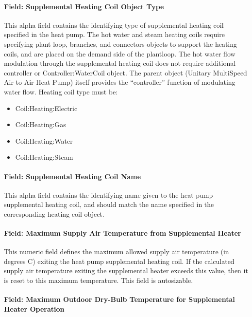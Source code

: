 \paragraph{Field: Supplemental Heating Coil Object Type}\label{field-supplemental-heating-coil-object-type-2}

This alpha field contains the identifying type of supplemental heating coil specified in the heat pump. The hot water and steam heating coils require specifying plant loop, branches, and connectors objects to support the heating coils, and are placed on the demand side of the plantloop. The hot water flow modulation through the supplemental heating coil does not require additional controller or Controller:WaterCoil object. The parent object (Unitary MultiSpeed Air to Air Heat Pump) itself provides the ``controller'' function of modulating water flow. Heating coil type must be:

\begin{itemize}
\item
  Coil:Heating:Electric
\item
  Coil:Heating:Gas
\item
  Coil:Heating:Water
\item
  Coil:Heating:Steam
\end{itemize}

\paragraph{Field: Supplemental Heating Coil Name}\label{field-supplemental-heating-coil-name-2}

This alpha field contains the identifying name given to the heat pump supplemental heating coil, and should match the name specified in the corresponding heating coil object.

\paragraph{Field: Maximum Supply Air Temperature from Supplemental Heater}\label{field-maximum-supply-air-temperature-from-supplemental-heater-1}

This numeric field defines the maximum allowed supply air temperature (in degrees C) exiting the heat pump supplemental heating coil. If the calculated supply air temperature exiting the supplemental heater exceeds this value, then it is reset to this maximum temperature. This field is autosizable.

\paragraph{Field: Maximum Outdoor Dry-Bulb Temperature for Supplemental Heater Operation}\label{field-maximum-outdoor-dry-bulb-temperature-for-supplemental-heater-operation-2}

